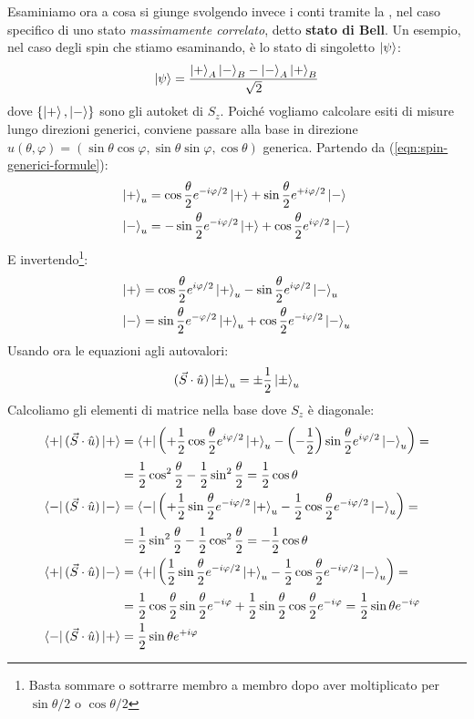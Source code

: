 \documentclass[../../FisicaTeorica.tex]{subfiles}
\begin{document}
Esaminiamo ora a cosa si giunge svolgendo invece i conti tramite la \MQ, nel caso specifico di uno stato \textit{massimamente correlato}, detto \textbf{stato di Bell}. Un esempio, nel caso degli spin che stiamo esaminando, è lo stato di singoletto $\Ket{\psi}$:
\begin{align*}
\Ket{\psi} = \frac{\Ket{+}_A \Ket{-}_B - \Ket{-}_A \Ket{+}_B}{\sqrt{2}}
\end{align*}
dove $\{\Ket{+}, \Ket{-}\}$ sono gli autoket di $S_z$. Poiché vogliamo calcolare esiti di misure lungo direzioni generici, conviene passare alla base in direzione $\hat{u}(\theta,\varphi)=(\sin\theta\cos\varphi, \sin\theta\sin\varphi, \cos\theta)$ generica. Partendo da (\ref{eqn:spin-generici-formule}):
\begin{align*}
\Ket{+}_u &= \cos\frac{\theta}{2}e^{-i\varphi/2}\Ket{+} + \sin\frac{\theta}{2}e^{+i\varphi/2}\Ket{-}\\
\Ket{-}_u &= -\sin\frac{\theta}{2}e^{-i\varphi/2}\Ket{+}+\cos\frac{\theta}{2}e^{i\varphi/2}\Ket{-}
\end{align*}
E invertendo\footnote{Basta sommare o sottrarre membro a membro dopo aver moltiplicato per $\sin\theta/2$ o $\cos\theta/2$}:
\begin{align*}
\Ket{+} &= \cos\frac{\theta}{2} e^{i\varphi/2} \Ket{+}_u - \sin\frac{\theta}{2}e^{i\varphi/2} \Ket{-}_u\\
\Ket{-} &= \sin \frac{\theta}{2} e^{-\varphi/2}\Ket{+}_u + \cos\frac{\theta}{2} e^{-i\varphi/2}\Ket{-}_u
\end{align*}
Usando ora le equazioni agli autovalori:
\begin{align*}
(\vec{S}\cdot \hat{u})\Ket{\pm}_u =\pm \frac{1}{2}\Ket{\pm}_u
\end{align*}
Calcoliamo gli elementi di matrice nella base dove $S_z$ è diagonale:
\begin{align*}
\Bra{+}(\vec{S}\cdot \hat{u})\Ket{+} &= \Bra{+}\left(+\frac{1}{2}\cos\frac{\theta}{2}e^{i\varphi/2}\Ket{+}_u -\left(-\frac{1}{2}\right) \sin\frac{\theta}{2}e^{i\varphi/2}\Ket{-}_u\right)=\\
&=\frac{1}{2}\cos^2\frac{\theta}{2}-\frac{1}{2}\sin^2\frac{\theta}{2}=\frac{1}{2}\cos\theta\\
\Bra{-}(\vec{S}\cdot \hat{u})\Ket{-} &= \Bra{-}\left(+\frac{1}{2}\sin\frac{\theta}{2}e^{-i\varphi/2}\Ket{+}_u - \frac{1}{2}\cos\frac{\theta}{2}e^{-i\varphi/2}\Ket{-}_u\right)=\\
&=\frac{1}{2}\sin^2\frac{\theta}{2}-\frac{1}{2}\cos^2\frac{\theta}{2} = -\frac{1}{2}\cos\theta\\
\Bra{+}(\vec{S}\cdot \hat{u})\Ket{-} &= \Bra{+}\left(\frac{1}{2}\sin\frac{\theta}{2}e^{-i\varphi/2}\Ket{+}_u - \frac{1}{2}\cos\frac{\theta}{2}e^{-i\varphi/2}\Ket{-}_u\right)=\\
&=\frac{1}{2}\cos\frac{\theta}{2}\sin\frac{\theta}{2}e^{-i\varphi} + \frac{1}{2}\sin\frac{\theta}{2}\cos\frac{\theta}{2}e^{-i\varphi} = \frac{1}{2}\sin\theta e^{-i\varphi}\\
\Bra{-}(\vec{S}\cdot \hat{u})\Ket{+}&=\frac{1}{2}\sin\theta e^{+i\varphi}
\end{align*}
\end{document}
